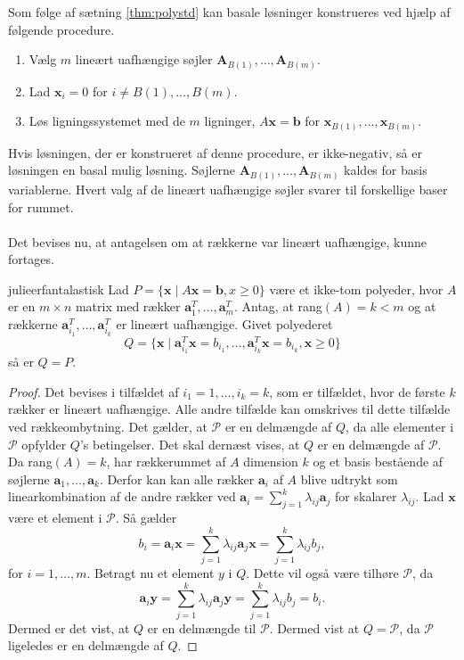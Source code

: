 \noindent
Som følge af sætning \ref{thm:polystd} kan basale løsninger konstrueres ved hjælp af følgende procedure.
\begin{enumerate}
\item Vælg $m$ lineært uafhængige søjler $\textbf{A}_{B(1)},\ldots,\textbf{A}_{B(m)}.$
\item Lad $\textbf{x}_i=0$ for $i \neq B(1),\ldots,B(m).$
\item Løs ligningssystemet med de $m$ ligninger, $A\textbf{x}=\textbf{b}$ for $\textbf{x}_{B(1)}, \ldots , \textbf{x}_{B(m)}.$
\end{enumerate}
Hvis løsningen, der er konstrueret af denne procedure, er ikke-negativ, så er løsningen en basal mulig løsning. Søjlerne $\textbf{A}_{B(1)},\ldots,\textbf{A}_{B(m)}$ kaldes for basis variablerne. Hvert valg af de lineært uafhængige søjler svarer til forskellige baser for rummet.
\\\\
\noindent
Det bevises nu, at antagelsen om at rækkerne var lineært uafhængige, kunne fortages.
\begin{thm}{}{julieerfantalastisk}
Lad $P=\{\textbf{x} \mid  A\textbf{x}=\textbf{b},x \geq 0\}$ være et ikke-tom polyeder, hvor $A$ er en $m \times n$ matrix med rækker $\textbf{a}^{T}_{1},\ldots,\textbf{a}^{T}_{m}$.
Antag, at rang$(A)=k<m$ og at rækkerne $\textbf{a}^T_{i_1},\ldots,\textbf{a}^T_{i_k}$ er lineært uafhængige. Givet polyederet 
$$Q=\{\textbf{x} \mid \textbf{a}^T_{i_1}\textbf{x}=b_{i_1},\ldots,\textbf{a}^T_{i_k}\textbf{x}=b_{i_k}, \textbf{x} \geq 0  \}$$ 
så er $Q=P$.
\end{thm}
\begin{proof}
Det bevises i tilfældet af $i_1=1,\ldots,i_k=k$, som er tilfældet, hvor de første $k$ rækker er lineært uafhængige. 
Alle andre tilfælde kan omskrives til dette tilfælde ved rækkeombytning. 
Det gælder, at $\mathcal{P}$ er en delmængde af $Q$, da alle elementer i $\mathcal{P}$ opfylder $Q$'s betingelser. 
Det skal dernæst vises, at $Q$ er en delmængde af $\mathcal{P}$.
Da rang$(A)=k$, har rækkerummet af $A$ dimension $k$ og et basis bestående af søjlerne $\textbf{a}_1,\ldots,\textbf{a}_k$. 
Derfor kan kan alle rækker $\textbf{a}_i$ af $A$ blive udtrykt som linearkombination af de andre rækker ved $\textbf{a}_i=\sum^{k}_{j=1}\lambda_{ij}\textbf{a}_j$ for skalarer $\lambda_{ij}$. 
Lad $\textbf{x}$ være et element i $\mathcal{P}$. 
Så gælder
$$b_i=\textbf{a}_i\textbf{x}=\sum^{k}_{j=1}\lambda_{ij}\textbf{a}_j\textbf{x}=\sum^{k}_{j=1}\lambda_{ij}b_j,$$
for $i=1,\ldots,m.$
Betragt nu et element $y$ i $Q$. 
Dette vil også være tilhøre $\mathcal{P}$, da
$$ \textbf{a}_i\textbf{y}=\sum^{k}_{j=1}\lambda_{ij}\textbf{a}_j\textbf{y}=\sum^{k}_{j=1}\lambda_{ij}b_j=b_i.$$
Dermed er det vist, at $Q$ er en delmængde til $\mathcal{P}$. 
Dermed vist at $Q=\mathcal{P}$, da $\mathcal{P}$ ligeledes er en delmængde af $Q$.
\end{proof} \\
